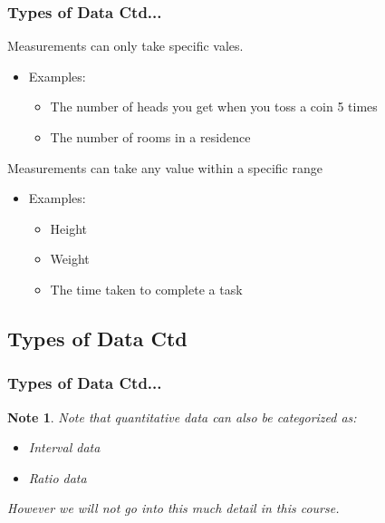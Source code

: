 \documentclass[xcolor=svgnames, compress]{beamer}
\newtheorem{nt}{Note}
\begin{document}
\begin{frame}
\frametitle{Types of Data Ctd...} 


\vspace*{-0.25cm}

\begin{definition}
\justifying Measurements can only take specific vales.
\end{definition}

\begin{itemize}
\item	Examples:
	\begin{itemize}\justifying
	\item	The number of heads you get when you toss a coin 5 times
	\item	The number of rooms in a residence
\end{itemize}
\end{itemize}




\begin{definition}
Measurements can take \alert{any} value within a specific range
\end{definition}

\begin{itemize}
\item	Examples:
	\begin{itemize}\justifying
	\item Height
	\item Weight
	\item	The time taken to complete a task
	\end{itemize}
\end{itemize}

\end{frame}





\subsection*{Types of Data Ctd}

\begin{frame}
\frametitle{Types of Data Ctd...} 

\vspace{-1.00cm}

\begin{nt}
Note that quantitative data can also be categorized as:
\begin{itemize}\justifying
\item	Interval data
\item	Ratio data
\end{itemize}
However we will not go into this much detail in this course.
\end{nt}

\hfill\\

\end{frame}
\end{document}
